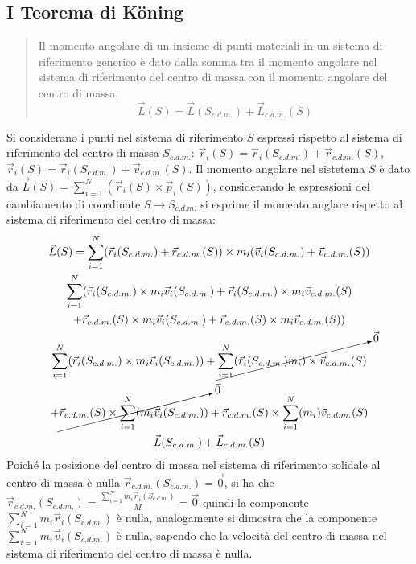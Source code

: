 \documentclass{article}
\numberwithin{equation}{subsection}
\begin{document}
\subsection{I Teorema di K\"oning}
\begin{quotation}
    Il momento angolare di un insieme di punti materiali in un 
    sistema di riferimento generico è dato dalla somma tra 
    il momento angolare nel sistema di riferimento del centro 
    di massa con il momento angolare del centro di massa.
    \begin{equation}
        \vec{L}(S)=\vec{L}(S_{c.d.m.})+\vec{L}_{c.d.m.}(S)
    \end{equation}
\end{quotation}
Si considerano i punti nel sistema di riferimento $S$ espressi rispetto al sistema di riferimento del centro di massa $S_{c.d.m.}$: $\vec{r}_i(S)=\vec{r}_i(S_{c.d.m.})+\vec{r}_{c.d.m.}(S)$, 
$\vec{r}_i(S)=\vec{r}_i(S_{c.d.m.})+\vec{v}_{c.d.m.}(S)$.
Il momento angolare nel sistetema $S$ è dato da $\vec{L}(S)=\displaystyle\sum_{i=1}^{N}(\vec{r}_i(S)\times\vec{p}_i(S))$, 
considerando le espressioni del cambiamento di coordinate $S\to S_{c.d.m.}$ si esprime il momento anglare rispetto al sistema di riferimento del centro di massa: 
\begin{gather*}
    \vec{L}(S)=\displaystyle\sum_{i=1}^{N}(\vec{r}_i(S_{c.d.m.})+\vec{r}_{c.d.m.}(S))\times m_i(\vec{v}_i(S_{c.d.m.})+\vec{v}_{c.d.m.}(S))\\
    \displaystyle\sum_{i=1}^{N}(\vec{r}_i(S_{c.d.m.})\times m_i\vec{v}_i(S_{c.d.m.})+\vec{r}_i(S_{c.d.m.})\times m_i\vec{v}_{c.d.m.}(S)\\
    +\vec{r}_{c.d.m.}(S)\times m_i\vec{v}_i(S_{c.d.m.})+\vec{r}_{c.d.m.}(S)\times m_i\vec{v}_{c.d.m.}(S))\\
    \displaystyle\sum_{i=1}^{N}(\vec{r}_i(S_{c.d.m.})\times m_i\vec{v}_i(S_{c.d.m.}))+\cancelto{\vec0}{\sum_{i=1}^{N}(\vec{r}_i(S_{c.d.m.})m_i)\times \vec{v}_{c.d.m.}(S)}\\
    +\cancelto{\vec0}{\vec{r}_{c.d.m.}(S)\times\sum_{i=1}^{N}(m_i\vec{v}_i(S_{c.d.m.}))}+\vec{r}_{c.d.m.}(S)\times\sum_{i=1}^{N}(m_i)\vec{v}_{c.d.m.}(S)\\
    \vec{L}(S_{c.d.m.})+\vec{L}_{c.d.m.}(S)
\end{gather*}
Poiché la posizione del centro di massa nel sistema di riferimento solidale al centro di massa è nulla $\vec{r}_{c.d.m.}(S_{c.d.m.})=\vec{0}$, 
si ha che $\vec{r}_{c.d.m.}(S_{c.d.m.})=\displaystyle\frac{\sum_{i=1}^{N}m_i\vec{r}_i(S_{c.d.m.})}{M}=\vec{0}$ 
quindi la componente $\sum_{i=1}^{N}m_i\vec{r}_i(S_{c.d.m.})$ è nulla, analogamente si dimostra che la componente $\sum_{i=1}^{N}m_i\vec{v}_i(S_{c.d.m.})$ è nulla, sapendo 
che la velocità del centro di massa nel sistema di riferimento del centro di massa è nulla.
\end{document}
